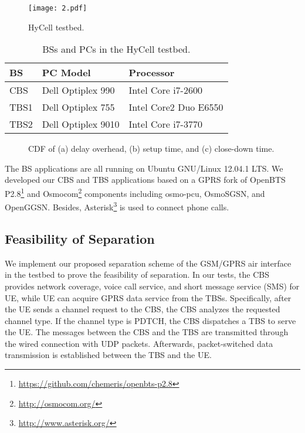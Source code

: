\documentclass[conference]{IEEEtran}
\begin{document}
\begin{figure}[!t]
  \centering
  \texttt{[image: 2.pdf]}
  \caption{HyCell testbed.}
  \label{fig:testbed}
\end{figure}
\begin{table}[!t]
  \renewcommand{\arraystretch}{1.3}
  \caption{BSs and PCs in the HyCell testbed.}
  \label{tab:pc}
  \centering
  \begin{tabular}{lll}
    \hline
    BS& PC Model & Processor \\
    \hline
    CBS  & Dell Optiplex 990 & Intel Core i7-2600 \\
    TBS1 & Dell Optiplex 755 & Intel Core2 Duo  E6550 \\
    TBS2 & Dell Optiplex 9010 & Intel Core i7-3770 \\
    \hline
  \end{tabular}
\end{table}
\begin{figure*}[!t]
  \centering
  \hfil
  \hfil
  \caption{CDF of (a) delay overhead, (b) setup time, and (c) close-down time.}
  \label{fig:cdf}
\end{figure*}

The BS applications are all running on Ubuntu GNU/Linux 12.04.1 LTS.
We developed our CBS and TBS applications based on a GPRS fork of OpenBTS
P2.8\footnote{\url{https://github.com/chemeris/openbts-p2.8}}
and Osmocom\footnote{\url{http://osmocom.org/}}
components including osmo-pcu, Osmo\-SGSN, and Open\-GGSN. Besides,
Asterisk\footnote{\url{http://www.asterisk.org/}} is used to connect phone calls.

\subsection{Feasibility of Separation}

We implement our proposed separation scheme of the GSM/GPRS air interface in the testbed to prove the
feasibility of separation.
In our tests, the CBS provides network coverage, voice call service, and short message service (SMS)
for UE, while UE can acquire GPRS data service from the TBSs.
Specifically, after the UE sends a channel
request to the CBS, the CBS analyzes the requested channel type. If the
channel type is PDTCH, the CBS dispatches a TBS to serve the UE.
The messages between the CBS and the TBS are transmitted through the wired
connection with UDP packets.
Afterwards, packet-switched data transmission is established between
the TBS and the UE.
\end{document}
